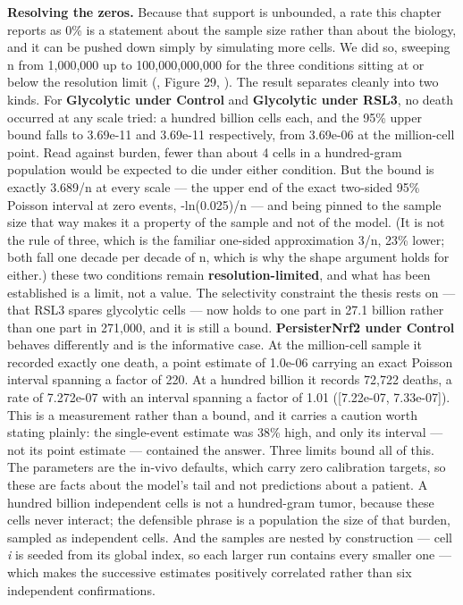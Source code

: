 \documentclass[11pt,twoside,openright]{report}
\begin{document}
\textbf{Resolving the zeros.} Because that support is unbounded, a rate this chapter reports as 0\% is a statement about the sample size rather than about the biology, and it can be pushed down simply by simulating more cells. We did so, sweeping n from 1,000,000 up to 100,000,000,000 for the three conditions sitting at or below the resolution limit (, Figure 29, ). The result separates cleanly into two kinds. For \textbf{Glycolytic under Control} and \textbf{Glycolytic under RSL3}, no death occurred at any scale tried: a hundred billion cells each, and the 95\% upper bound falls to 3.69e-11 and 3.69e-11 respectively, from 3.69e-06 at the million-cell point. Read against burden, fewer than about 4 cells in a hundred-gram population would be expected to die under either condition. But the bound is exactly 3.689/n at every scale --- the upper end of the exact two-sided 95\% Poisson interval at zero events, -ln(0.025)/n --- and being pinned to the sample size that way makes it a property of the sample and not of the model. (It is not the rule of three, which is the familiar one-sided approximation 3/n, 23\% lower; both fall one decade per decade of n, which is why the shape argument holds for either.) these two conditions remain \textbf{resolution-limited}, and what has been established is a limit, not a value. The selectivity constraint the thesis rests on --- that RSL3 spares glycolytic cells --- now holds to one part in 27.1 billion rather than one part in 271,000, and it is still a bound. \textbf{PersisterNrf2 under Control} behaves differently and is the informative case. At the million-cell sample it recorded exactly one death, a point estimate of 1.0e-06 carrying an exact Poisson interval spanning a factor of 220. At a hundred billion it records 72,722 deaths, a rate of 7.272e-07 with an interval spanning a factor of 1.01 ([7.22e-07, 7.33e-07]). This is a measurement rather than a bound, and it carries a caution worth stating plainly: the single-event estimate was 38\% high, and only its interval --- not its point estimate --- contained the answer. Three limits bound all of this. The parameters are the in-vivo defaults, which carry zero calibration targets, so these are facts about the model's tail and not predictions about a patient. A hundred billion independent cells is not a hundred-gram tumor, because these cells never interact; the defensible phrase is a population the size of that burden, sampled as independent cells. And the samples are nested by construction --- cell \textit{i} is seeded from its global index, so each larger run contains every smaller one --- which makes the successive estimates positively correlated rather than six independent confirmations.
\end{document}
